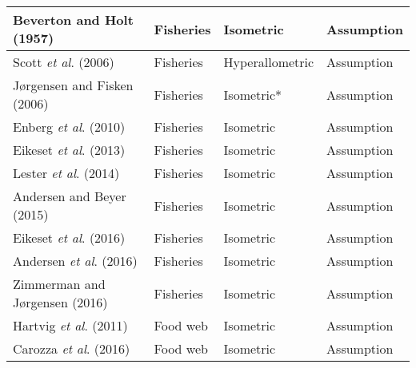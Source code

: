 \documentclass[a4paper]{article} %
\begin{document}
\begin{table}[H]
\begin{tabular}{|l|l|l|l|}
    Beverton and Holt (1957)                & Fisheries                 & Isometric        & Assumption                     \\ \hline
    Scott \textit{et al}. (2006)            & Fisheries                 & Hyperallometric  & Assumption                     \\ \hline
    Jørgensen and Fisken (2006)             & Fisheries                 & Isometric*       & Assumption                     \\ \hline
    Enberg \textit{et al}. (2010)           & Fisheries                 & Isometric        & Assumption                     \\ \hline
    Eikeset \textit{et al}. (2013)          & Fisheries                 & Isometric        & Assumption                     \\ \hline
    Lester \textit{et al}. (2014)           & Fisheries                 & Isometric        & Assumption                     \\ \hline
    Andersen and Beyer (2015)               & Fisheries                 & Isometric        & Assumption                     \\ \hline
    Eikeset \textit{et al}. (2016)          & Fisheries                 & Isometric        & Assumption                     \\ \hline
    Andersen \textit{et al}. (2016)         & Fisheries                 & Isometric        & Assumption                     \\ \hline
    Zimmerman and Jørgensen (2016)          & Fisheries                 & Isometric        & Assumption                     \\ \hline
    Hartvig \textit{et al}. (2011)          & Food web                  & Isometric        & Assumption                     \\ \hline
    Carozza \textit{et al}. (2016)          & Food web                  & Isometric        & Assumption                     \\ \hline
    \end{tabular}
\end{table}

\newpage{}

\let\mkbibnamefamily\textsc\printbibliography[title=SI Bibliography]\thispagestyle{empty} %
\end{document}
